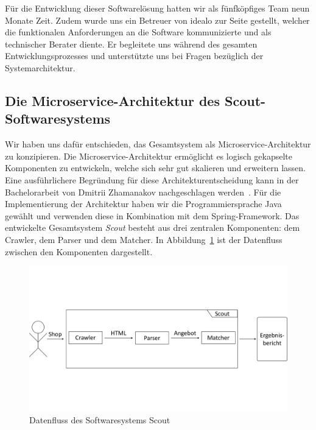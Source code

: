 Für die Entwicklung dieser Softwarelösung hatten wir als fünfköpfiges Team neun Monate Zeit.
Zudem wurde uns ein Betreuer von idealo zur Seite gestellt, welcher die funktionalen Anforderungen an die
Software kommunizierte und als technischer Berater diente.
Er begleitete uns während des gesamten Entwicklungsprozesses und unterstützte uns bei Fragen bezüglich der
Systemarchitektur.

\subsection{Die Microservice-Architektur des Scout-Softwaresystems}
\label{subsec:microservice-architektur}

Wir haben uns dafür entschieden, das Gesamtsystem als Microservice-Architektur zu konzipieren.
Die Microservice-Architektur ermöglicht es logisch gekapselte Komponenten zu entwickeln, welche sich sehr gut
skalieren und erweitern lassen.
Eine ausführlichere Begründung für diese Architekturentscheidung kann in der Bachelorarbeit von Dmitrii
Zhamanakov nachgeschlagen werden~\cite{thesis:dmitrii}.
Für die Implementierung der Architektur haben wir die Programmiersprache Java gewählt und verwenden diese in
Kombination mit dem Spring-Framework\footnotemark.
Das entwickelte Gesamtsystem \textit{Scout} besteht aus drei zentralen Komponenten: dem Crawler, dem Parser und dem
Matcher.
In Abbildung~\ref{abb:datenfluss-grob} ist der Datenfluss zwischen den Komponenten dargestellt.

\begin{figure}[H]
    \centering
    \includegraphics[width=\textwidth, trim=0 5.5cm 0 5.5cm, clip]{resources/Datenfluss-Gesamt-Grob.pdf}
    \caption{Datenfluss des Softwaresystems Scout}
    \label{abb:datenfluss-grob}
    \vspace{-0.25cm}
\end{figure}

